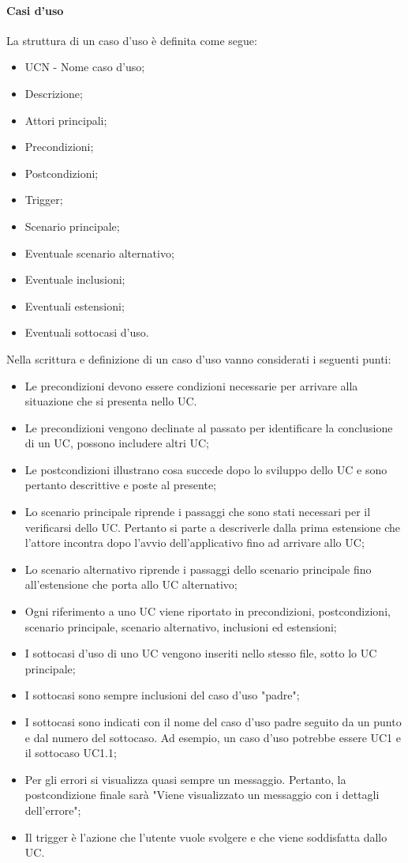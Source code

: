 \paragraph{Casi d'uso}
La struttura di un caso d'uso è definita come segue:
\begin{itemize}
  \item UCN - Nome caso d'uso;
  \item Descrizione;
  \item Attori principali;
  \item Precondizioni;
  \item Postcondizioni;
  \item Trigger;
  \item Scenario principale;
  \item Eventuale scenario alternativo;
  \item Eventuale inclusioni;
  \item Eventuali estensioni;
  \item Eventuali sottocasi d'uso.
\end{itemize}
Nella scrittura e definizione di un caso d'uso vanno considerati i seguenti punti:
\begin{itemize}
  \item Le precondizioni devono essere condizioni necessarie per arrivare alla situazione che si presenta nello UC.
  \item Le precondizioni vengono declinate al passato per identificare la conclusione di un UC, possono includere altri UC;
  \item Le postcondizioni illustrano cosa succede dopo lo sviluppo dello UC e sono pertanto descrittive e poste al presente;
  \item Lo scenario principale riprende i passaggi che sono stati necessari per il verificarsi dello UC. Pertanto si parte a descriverle dalla prima estensione che l'attore incontra dopo l'avvio dell'applicativo fino ad arrivare allo UC;
  \item Lo scenario alternativo riprende i passaggi dello scenario principale fino all'estensione che porta allo UC alternativo;
  \item Ogni riferimento a uno UC viene riportato in precondizioni, postcondizioni, scenario principale, scenario alternativo, inclusioni ed estensioni;
  \item I sottocasi d'uso di uno UC vengono inseriti nello stesso file, sotto lo UC principale;
  \item I sottocasi sono sempre inclusioni del caso d'uso "padre";
  \item I sottocasi sono indicati con il nome del caso d'uso padre seguito da un punto e dal numero del sottocaso. Ad esempio, un caso d'uso potrebbe essere UC1 e il sottocaso UC1.1;
  \item Per gli errori si visualizza quasi sempre un messaggio. Pertanto, la postcondizione finale sarà "Viene visualizzato un messaggio con i dettagli dell'errore";
  \item Il trigger è l'azione che l'utente vuole svolgere e che viene soddisfatta dallo UC.
\end{itemize}

